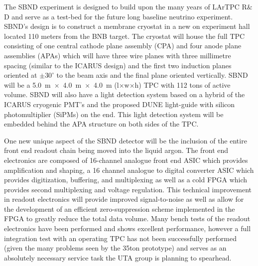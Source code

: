 \label{sec:IF_SBND}
The SBND experiment is designed to build upon the many years of LArTPC R$\&$D and serve as a test-bed for the future long baseline neutrino experiment. SBND's design is to construct a membrane cryostat in a new on experiment hall located 110 meters from the BNB target. The cryostat will house the full TPC consisting of one central cathode plane assembly (CPA) and four anode plane assemblies (APAs) which will have three wire planes with three millimetre spacing (similar to the ICARUS design) and the first two induction planes oriented at $\pm 30^{\circ}$ to the beam axis and the final plane oriented vertically. SBND will be a 5.0~m~$\times$~4.0~m~$\times$~4.0~m (l$\times$w$\times$h) TPC with 112 tons of active volume. SBND will also have a light detection system based on a hybrid of the ICARUS cryogenic PMT's and the proposed DUNE light-guide with silicon photomultiplier (SiPMs) on the end. This light detection system will be embedded behind the APA structure on both sides of the TPC. 


One new unique aspect of the SBND detector will be the inclusion of the entire front end readout chain being moved into the liquid argon. The front end electronics are composed of 16-channel analogue front end ASIC which provides amplification and shaping, a 16 channel analogue to digital converter ASIC which provides digitization, buffering, and multiplexing as well as a cold FPGA which provides second multiplexing and voltage regulation. This technical improvement in readout electronics will provide improved signal-to-noise as well as allow for the development of an efficient zero-suppression scheme implemented in the FPGA to greatly reduce the total data volume. Many bench tests of the readout electronics have been performed and shows excellent performance, however a full integration test with an operating TPC has not been successfully performed (given the many problems seen by the 35ton prototype) and serves as an absolutely necessary service task the UTA group is planning to spearhead. 

